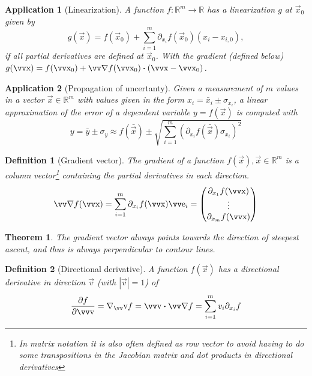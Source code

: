 \documentclass[twocolumn, margin=small]{tex/hsrzf}
\theoremstyle{fuvarzf}
\newtheorem{theorem}{Theorem}
\newtheorem{application}{Application}
\newtheorem{definition}{Definition}
\begin{document}
\begin{application}[Linearization]
  A function \(f: \mathbb{R}^m\to\mathbb{R}\) has a linearization \(g\) at
  \(\vec{x}_0\) given by
  \[
    g(\vec{x}) = f(\vec{x}_0) 
      + \sum_{i=1}^m \partial_{x_i} f(\vec{x}_0)(x_i - x_{i,0}) ,
  \]
  if all partial derivatives are defined at \(\vec{x}_0\). With the gradient
  (defined below) \(g(\vec{x}) = f(\vec{x}_0) + \grad f(\vec{x}_0) \dotp
  (\vec{x} - \vec{x}_0)\).
\end{application}

\begin{application}[Propagation of uncertanty]
  Given a measurement of \(m\) values in a vector \(\vec{x}\in\mathbb{R}^m\)
  with values given in the form \(x_i = \bar{x}_i \pm \sigma_{x_i}\), a linear
  approximation of the error of a dependent variable \(y = f(\vec{x})\) is
  computed with
  \[
    y = \bar{y} \pm \sigma_y \approx f(\bar{\vec{x}})
      \pm \sqrt{\sum_{i=1}^m \left(
        \partial_{x_i} f(\bar{\vec{x}}) \sigma_{x_i}\right)^2}
  \]
\end{application}

\begin{definition}[Gradient vector]
  The \emph{gradient} of a function \(f(\vec{x}), \vec{x}\in\mathbb{R}^m\) is a
  column vector\footnote{In matrix notation it is also often defined as row
  vector to avoid having to do some transpositions in the Jacobian matrix and
  dot products in directional derivatives} containing the partial derivatives
  in each direction.
  \[
    \grad f (\vec{x}) = \sum_{i=1}^m \partial_{x_i} f(\vec{x}) \vec{e}_i
      = \begin{pmatrix}
        \partial_{x_1} f(\vec{x}) \\
        \vdots \\
        \partial_{x_m} f(\vec{x}) \\
      \end{pmatrix}
  \]
\end{definition}

\begin{theorem}
  The gradient vector always points towards \emph{the direction of steepest
  ascent}, and thus is always perpendicular to contour lines.
\end{theorem}

\begin{definition}[Directional derivative]
  A function \(f(\vec{x})\) has a directional derivative in direction
  \(\vec{v}\) (with \(|\vec{v}|=1\)) of
  \[
    \frac{\partial f}{\partial\vec{v}} 
      = \nabla_\vec{v} f = \vec{v} \dotp \grad f
      = \sum_{i=1}^m v_i \partial_{x_i} f
  \]
\end{definition}
\end{document}
